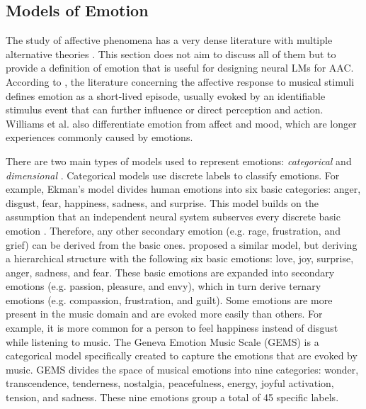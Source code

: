 \subsection{Models of Emotion}

The study of affective phenomena has a very dense literature with multiple alternative theories \cite{ekkekakis2013measurement}. This section does not aim to discuss all of them but to provide a definition of emotion that is useful for designing neural LMs for AAC.  According to \citet{williams2015investigating}, the literature concerning the affective response to musical stimuli defines emotion as a short-lived episode, usually evoked by an identifiable stimulus event that can further influence or direct perception and action. Williams et al. \cite{williams2015investigating} also differentiate emotion from affect and mood, which are longer experiences commonly caused by emotions.

There are two main types of models used to represent emotions: \emph{categorical} and \emph{dimensional} \cite{eerola2011comparison}. Categorical models use discrete labels to classify emotions. For example, Ekman's model \cite{ekman1992argument} divides human emotions into six basic categories: anger, disgust, fear, happiness, sadness, and surprise. This model builds on the assumption that an independent neural system subserves every discrete basic emotion \cite{eerola2011comparison}. Therefore, any other secondary emotion (e.g. rage, frustration, and grief) can be derived from the basic ones. \citet{parrott2001emotions} proposed a similar model, but deriving a hierarchical structure with the following six basic emotions: love, joy, surprise, anger, sadness, and fear. These basic emotions are expanded into secondary emotions (e.g. passion, pleasure, and envy), which in turn derive ternary emotions (e.g. compassion, frustration, and guilt). Some emotions are more present in the music domain and are evoked more easily than others. For example, it is more common for a person to feel happiness instead of disgust while listening to music. The Geneva Emotion Music Scale (GEMS) \cite{zentner2008emotions} is a categorical model specifically created to capture the emotions that are evoked by music. GEMS divides the space of musical emotions into nine categories: wonder, transcendence, tenderness, nostalgia, peacefulness, energy, joyful activation, tension, and sadness. These nine emotions group a total of 45 specific labels.

